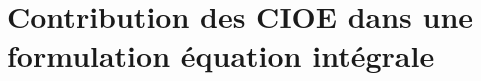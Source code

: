 \chapter{Contribution des CIOE dans une formulation équation intégrale}
\label{sec:equation_integrale}
\minitoc
\newpage
